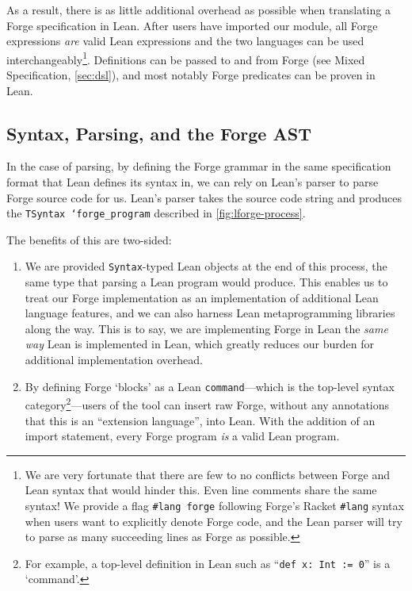 As a result, there is as little additional overhead as possible when translating a Forge specification in Lean. After users have imported our module, all Forge expressions \emph{are} valid Lean expressions and the two languages can be used interchangeably\footnote{We are very fortunate that there are few to no conflicts between Forge and Lean syntax that would hinder this. Even line comments share the same syntax! We provide a flag \texttt{\#lang forge} following Forge's Racket \texttt{\#lang} syntax when users want to explicitly denote Forge code, and the Lean parser will try to parse as many succeeding lines as Forge as possible.}. Definitions can be passed to and from Forge (see Mixed Specification, \cref{sec:dsl}), and most notably Forge predicates can be proven in Lean. 

\subsection{Syntax, Parsing, and the Forge AST}\label{sec:parsing}
In the case of parsing, by defining the Forge grammar in the same specification format that Lean defines its syntax in, we can rely on Lean's parser to parse Forge source code for us. Lean's parser takes the source code string and produces the \texttt{TSyntax `forge_program} described in \cref{fig:lforge-process}. 

The benefits of this are two-sided:
\begin{enumerate}
  \item We are provided \texttt{Syntax}-typed Lean objects at the end of this process, the same type that parsing a Lean program would produce. This enables us to treat our Forge implementation as an implementation of additional Lean language features, and we can also harness Lean metaprogramming libraries along the way. This is to say, we are implementing Forge in Lean the \emph{same way} Lean is implemented in Lean, which greatly reduces our burden for additional implementation overhead.
  \item By defining Forge `blocks' as a Lean \texttt{command}---which is the top-level syntax category\footnote{For example, a top-level definition in Lean such as ``\texttt{def x: Int := 0}'' is a `command'.}---users of the tool can insert raw Forge, without any annotations that this is an ``extension language'', into Lean. With the addition of an import statement, every Forge program \emph{is} a valid Lean program.
\end{enumerate}

